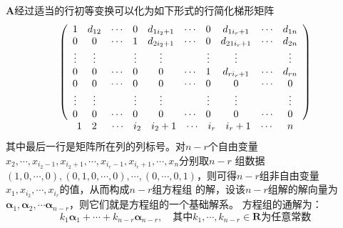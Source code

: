 \begin{theorem}
    $\boldsymbol{A}$经过适当的行初等变换可以化为如下形式的行简化梯形矩阵
    $$\begin{array}{c}\left(\begin{array}{cccccccccc}
        1 & d_{12} & \cdots & 0 & d_{1i_2+1} & \cdots & 0 & d_{1i_r+1} & \cdots & d_{1n} \\
        0 & 0 & \cdots & 1 & d_{2i_2+1} & \cdots & 0 & d_{21i_r+1} & \cdots & d_{2n} \\
        \vdots & \vdots & & \vdots & \vdots &  & \vdots & \vdots &  & \vdots\\
        0 & 0 & \cdots & 0 & 0 & \cdots & 1 & d_{ri_r+1} & \cdots & d_{rn} \\
        0 & 0 & \cdots & 0 & 0 & \cdots & 0 & 0 & \cdots & 0 \\
        \vdots & \vdots & & \vdots & \vdots &  & \vdots & \vdots &  & \vdots\\
        0 & 0 & \cdots & 0 & 0 & \cdots & 0 & 0 & \cdots & 0 
    \end{array}\right)\\
    \begin{array}{lccccccccc}
        1 & 2{\color{white} 0} & \cdots & i_2 & i_2+1 & \cdots & i_r & i_r+1 & \cdots & {\color{white} 0} n
    \end{array}
    \end{array}$$
    其中最后一行是矩阵所在列的列标号。对$n-r$个自由变量$x_2,\cdots,x_{i_2-1},x_{i_2+1},\cdots, x_{i_r-1}, x_{i_r+1},\cdots, x_n $分别取$n-r$
    组数据$(1,0,\cdots,0),(0,1,0,\cdots,0),\cdots,(0,\cdots,0,1)$，则可得$n-r$组非自由变量$x_1,x_{i_2},\cdots,x_{i_r}$的值，从而构成$n-r$组方程组
    的解，设该$n-r$组解的解向量为$\boldsymbol{\alpha}_1,\boldsymbol{\alpha}_2,\cdots\boldsymbol{\alpha}_{n-r}$，则它们就是方程组的一个基础解系。
    方程组的通解为：
    $$k_1\boldsymbol{\alpha}_1+\cdots+k_{n-r}\boldsymbol{\alpha}_{n-r},\quad \mbox{其中}k_1,\cdots,k_{n-r}\in \mathbf{R}\mbox{为任意常数}$$
\end{theorem}
